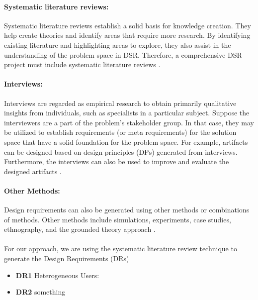 \paragraph*{Systematic literature reviews:} 
Systematic literature reviews establish a solid basis for knowledge creation. 
They help create theories and identify areas that require more research.
By identifying existing literature and highlighting areas to explore, they also assist in the understanding of the problem space in DSR.
Therefore, a comprehensive DSR project must include systematic literature reviews \cite{misc:dsr:webster}.

\paragraph*{Interviews:}
Interviews are regarded as empirical research to obtain primarily qualitative insights from individuals, such as specialists in a particular subject. 
Suppose the interviewers are a part of the problem's stakeholder group.
In that case, they may be utilized to establish requirements (or meta requirements) for the solution space that have a solid foundation for the problem space.
For example, artifacts can be designed based on design principles (DPs) generated from interviews.
Furthermore, the interviews can also be used to improve and evaluate the designed artifacts \cite{misc:dsr:mayring}. 

\paragraph*{Other Methods:}
Design requirements can also be generated using other methods or combinations of methods.
Other methods include simulations, experiments, case studies, ethnography, and the grounded theory approach \cite{misc:dsr:nickerson, misc:dsr:varshney}. \\ \\

For our approach, we are using the systematic literature review technique to generate the Design Requirements (DRs)
\begin{itemize}
  \item \textbf{DR1} Heterogeneous Users: 
  \item \textbf{DR2} something 
\end{itemize}



